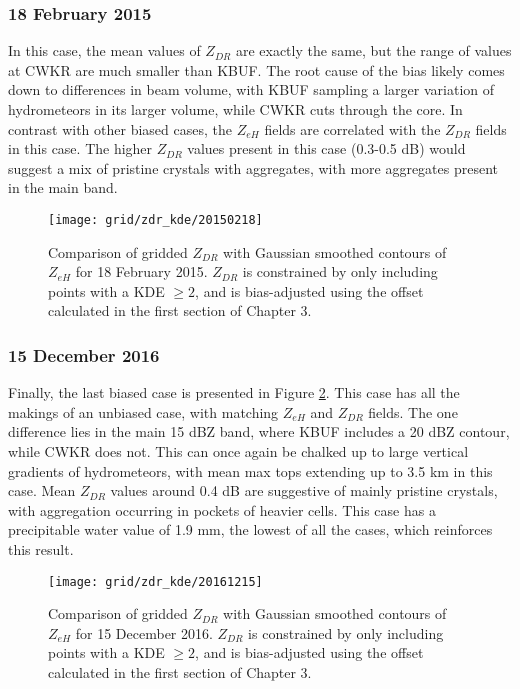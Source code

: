 \subsubsection{18 February 2015}
In this case, the mean values of $Z_{DR}$ are exactly the same, but the range of values at CWKR are much smaller than KBUF. The root cause of the bias likely comes down to differences in beam volume, with KBUF sampling a larger variation of hydrometeors in its larger volume, while CWKR cuts through the core. In contrast with other biased cases, the $Z_{eH}$ fields are correlated with the $Z_{DR}$ fields in this case. The higher $Z_{DR}$ values present in this case (0.3-0.5 dB) would suggest a mix of pristine crystals with aggregates, with more aggregates present in the main band. 
\begin{figure}[H]
\texttt{[image: grid/zdr\_kde/20150218]}
\caption{Comparison of gridded $Z_{DR}$ with Gaussian smoothed contours of $Z_{eH}$ for 18 February 2015. $Z_{DR}$ is constrained by only including points with a
KDE $\geq 2$, and is bias-adjusted using the offset calculated in the first section of Chapter 3.} 
\label{fig:grid_zdr_kde_20150218}
\end{figure}

\subsubsection{15 December 2016}
Finally, the last biased case is presented in Figure \ref{fig:grid_zdr_kde_20161215}. This case has all the makings of an unbiased case, with matching $Z_{eH}$ and $Z_{DR}$ fields. The one difference lies in the main 15 dBZ band, where KBUF includes a 20 dBZ contour, while CWKR does not. This can once again be chalked up to large vertical gradients of hydrometeors, with mean max tops extending up to 3.5 km in this case. Mean $Z_{DR}$ values around 0.4 dB are suggestive of mainly pristine crystals, with aggregation occurring in pockets of heavier cells. This case has a precipitable water value of 1.9 mm, the lowest of all the cases, which reinforces this result.
\begin{figure}[H]
\texttt{[image: grid/zdr\_kde/20161215]}
\caption{Comparison of gridded $Z_{DR}$ with Gaussian smoothed contours of $Z_{eH}$ for 15 December 2016. $Z_{DR}$ is constrained by only including points with a
KDE $\geq 2$, and is bias-adjusted using the offset calculated in the first section of Chapter 3.} 
\label{fig:grid_zdr_kde_20161215}
\end{figure}